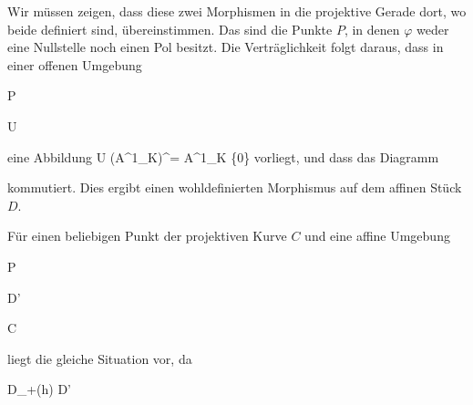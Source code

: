 {


Wir müssen zeigen, dass diese zwei Morphismen in die projektive Gerade dort, wo beide definiert sind, übereinstimmen. Das sind die Punkte $P$, in denen $\varphi$ weder eine Nullstelle noch einen Pol besitzt. Die Verträglichkeit folgt daraus, dass in einer offenen Umgebung


\mavergleichskette

{\vergleichskette

{ P
}

{ \in }{ U
}

{  }{
}

{    }{
}

{   }{
}

}
{}{}{}
eine Abbildung
 { U } { ({\mathbb A}^{1}_{K})^\times = {\mathbb A}^{1}_{K} \setminus \{0\}
} {}
vorliegt, und dass das Diagramm


 {  }


kommutiert. Dies ergibt einen wohldefinierten Morphismus auf dem affinen Stück $D$.


Für einen beliebigen Punkt der projektiven Kurve $C$ und eine affine Umgebung


\mavergleichskette

{\vergleichskette

{ P
}

{ \in }{ D'
}

{ \subset }{ C
}

{    }{
}

{   }{
}

}
{}{}{}
liegt die gleiche Situation vor, da


\mavergleichskette

{\vergleichskette

{ D_+(h) \cap D'
}

{ \neq }{ \emptyset
}

{  }{
}

{    }{
}

{   }{
}

}}
